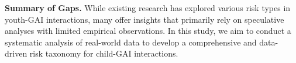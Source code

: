 \textbf{{Summary of Gaps.}} While existing research has explored various risk types in youth-GAI interactions, many offer insights that primarily rely on speculative analyses with limited empirical observations. In this study, we aim to conduct a systematic analysis of real-world data to develop a comprehensive and data-driven risk taxonomy for child-GAI interactions.